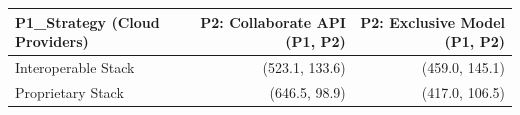 

\begin{tabular}{@{}lrr@{}}
\toprule
P1\_Strategy (Cloud Providers) & P2: Collaborate API (P1, P2) & P2: Exclusive Model (P1, P2) \\
\midrule
Interoperable Stack & (523.1, 133.6) & (459.0, 145.1) \\
Proprietary Stack & (646.5, 98.9) & (417.0, 106.5) \\
\bottomrule
\end{tabular}